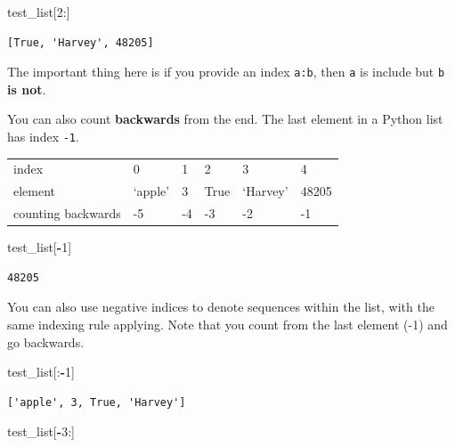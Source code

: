 \documentclass[
  letterpaper,
]{scrbook}
\newenvironment{Shaded}{\begin{snugshade}}{\end{snugshade}}
\newcommand{\DecValTok}[1]{\textcolor[rgb]{0.00,0.00,0.81}{#1}}
\newcommand{\NormalTok}[1]{#1}
\newcommand{\OperatorTok}[1]{\textcolor[rgb]{0.81,0.36,0.00}{\textbf{#1}}}
\begin{document}
\begin{Shaded}
\begin{Highlighting}[]
\NormalTok{test_list[}\DecValTok{2}\NormalTok{:]}
\end{Highlighting}
\end{Shaded}

\begin{verbatim}
[True, 'Harvey', 48205]
\end{verbatim}

The important thing here is if you provide an index \texttt{a:b}, then \texttt{a} is include but \texttt{b} \textbf{is not}.

You can also count \textbf{backwards} from the end. The last element in a Python list has index \texttt{-1}.

\begin{longtable}[]{@{}llllll@{}}
\toprule
\endhead
index & 0 & 1 & 2 & 3 & 4\tabularnewline
element & `apple' & 3 & True & `Harvey' & 48205\tabularnewline
counting backwards & -5 & -4 & -3 & -2 & -1\tabularnewline
\bottomrule
\end{longtable}

\begin{Shaded}
\begin{Highlighting}[]
\NormalTok{test_list[}\OperatorTok{-}\DecValTok{1}\NormalTok{]}
\end{Highlighting}
\end{Shaded}

\begin{verbatim}
48205
\end{verbatim}

You can also use negative indices to denote sequences within the list, with the same indexing rule applying. Note that you count from the last element (-1) and go backwards.

\begin{Shaded}
\begin{Highlighting}[]
\NormalTok{test_list[:}\OperatorTok{-}\DecValTok{1}\NormalTok{]}
\end{Highlighting}
\end{Shaded}

\begin{verbatim}
['apple', 3, True, 'Harvey']
\end{verbatim}

\begin{Shaded}
\begin{Highlighting}[]
\NormalTok{test_list[}\OperatorTok{-}\DecValTok{3}\NormalTok{:]}
\end{Highlighting}
\end{Shaded}
\end{document}

